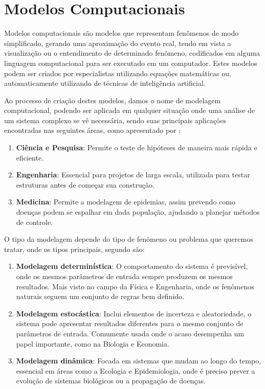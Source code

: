 \documentclass[
	12pt,				%
	openright,			%
	oneside,			%
	a4paper,			%
	english,			%
	brazil				%
	]{abntex2}
\begin{document}
\section{Modelos Computacionais}

Modelos computacionais são modelos que representam fenômenos de modo simplificado, gerando uma aproximação
do evento real, tendo em vista a visualização ou o entendimento de determinado fenômeno, codificados em 
alguma linguagem computacional para ser executado em um computador. Estes modelos podem ser criados
por especialistas utilizando equações matemáticas ou, automaticamente utilizando de técnicas de
inteligência artificial. \cite{modelos_computacionais}

Ao processo de criação destes modelos, damos o nome de modelagem computacional, podendo ser aplicada em
qualquer situação onde uma análise de um sistema complexo se vê necessária, sendo suas principais
aplicações encontradas nas seguintes áreas, como apresentado por \cite{modelagem_computacional}:

\begin{enumerate}
	\item \textbf{Ciência e Pesquisa}: Permite o teste de hipóteses de maneira mais rápida e eficiente.
	\item \textbf{Engenharia}: Essencial para projetos de larga escala, utilizada para testar estruturas antes de
	começar sua construção.
	\item \textbf{Medicina}: Permite a modelagem de epidemias, assim prevendo como doenças podem se espalhar em dada
	população, ajudando a planejar métodos de controle.
\end{enumerate}

O tipo da modelagem depende do tipo de fenômeno ou problema que queremos tratar, onde os tipos principais,
segundo \cite{modelagem_computacional} são:

\begin{enumerate}
	\item \textbf{Modelagem determinística}: O comportamento do sistema é previsível, onde os mesmos parâmetros de 
	entrada sempre produzem os mesmos resultados. Mais visto no campo da Física e Engenharia, onde os 
	fenômenos naturais seguem um conjunto de regras bem definido.
	\item \textbf{Modelagem estocástica}: Inclui elementos de incerteza e aleatoriedade, o sistema pode apresentar
	resultados diferentes para o mesmo conjunto de parâmetros de entrada. Comumente usada onde o acaso 
	desempenha um papel importante, como na Biologia e Economia.
	\item \textbf{Modelagem dinâmica}: Focada em sistemas que mudam ao longo do tempo, essencial em áreas como a
	Ecologia e Epidemiologia, onde é preciso prever a evolução de sistemas biológicos ou a propagação
	de doenças. 
\end{enumerate}
\end{document}
